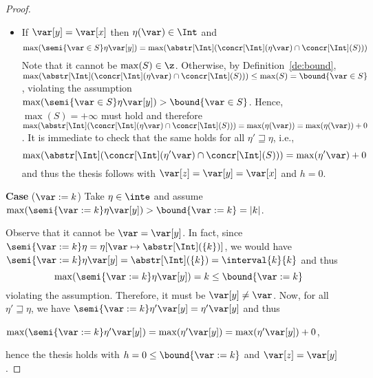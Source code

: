 \begin{proof}
\begin{itemize}
  \item If \(\var[y] = \var[x]\) then \(\eta(\var) \in \Int\) and
    \begin{equation*}
      \max(\semi{\var \in S}\eta \var[y]) = \max(\abstr[\Int](\concr[\Int](\eta\var) \cap \concr[\Int](S)))
    \end{equation*}
    Note that it cannot be \(\max(S)\in \z\). Otherwise, by
    Definition~\ref{de:bound},
    \(\max ({\abstr[\Int](\concr[\Int](\eta\var) \cap \concr[\Int](S))})
    \leq \max(S)= \bound{\var \in S}\), violating the assumption
    \(\max(\semi{\var \in S}\eta \var[y]) > \bound{\var \in S}\).
    Hence, \(\max(S) = +\infty\) must hold and therefore %
    \(\max ({\abstr[\Int](\concr[\Int](\eta\var) \cap
      \concr[\Int](S))}) = \max(\eta(\var)) = \max(\eta(\var)) +
    0\). It is immediate to check that the same holds for all
    \(\eta' \sqsupseteq \eta\), i.e.,
    \begin{equation*}
      \max(\abstr[\Int](\concr[\Int](\eta'\var) \cap \concr[\Int](S))) = \max(\eta'\var) + 0
    \end{equation*}
    and thus the thesis follows with  \(\var[z]=\var[y]=\var[x]\) and \(h=0\).
  \end{itemize}  
  
  \medskip
  
  \noindent
  \textbf{Case} (\(\var := k\))
  Take \(\eta \in \inte\) and assume
  \(\max(\semi{\var := k}\eta \var[y]) > \bound{\var := k} = |k|\).

  Observe that it cannot be \(\var = \var[y]\). In fact, since
  \(\semi{\var := k}\eta = \eta[\var \mapsto \abstr[\Int](\{k\})]\),
  we would have
  \(\semi{\var := k}\eta \var[y] = \abstr[\Int](\{k\}) =
  \interval{k}{k}\) and thus %
  \begin{equation*}
    \max(\semi{\var := k}\eta \var[y]) = k  \leq \bound{\var := k}
  \end{equation*}
  violating the assumption.
  Therefore, it must be \(\var[y] \neq \var\). Now, for all
  \(\eta' \sqsupseteq \eta\), we have
  \(\semi{\var := k}\eta' \var[y] = \eta' \var[y]\) and thus
  \begin{center}
    \(\max(\semi{\var := k}\eta' \var[y]) = \max(\eta' \var[y]) =
    \max(\eta' \var[y]) + 0\),
  \end{center}
  hence the thesis holds with \(h =0 \leq \bound{\var :=k}\) and \(\var[z] = \var[y]\).
  

\end{proof}
